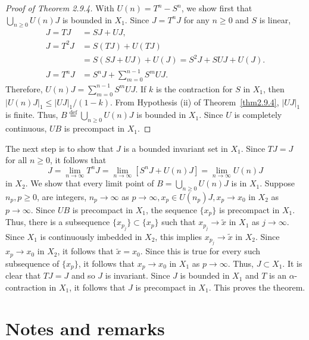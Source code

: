 \documentclass{surv-l}
\makeatletter
\theoremstyle{plain}
\theoremstyle{definition}
\numberwithin{equation}{section}
\numberwithin{figure}{chapter}
\newcommand\addtocline[2]{\let\@secnumber\@empty\@tocwrite{#1}{#2}}
\makeatother
\begin{document}
\begin{proof}[Proof of Theorem 2.9.4]\label{pot2.9.4} With $U(n)=T^{n}-S^{n}$, we show first that $\bigcup_{n\geq 0}U(n)J$ is bounded in $X_{1}$. Since $J=T^{n}J$ for any $n\geq 0$ and $S$ is linear,
\begin{align*}
J=TJ&=SJ+UJ,\\
J=T^{2}J&=S(TJ)+U(TJ)\\
&=S(SJ+UJ)+U(J)=S^{2}J+SUJ+U(J).\\
J=T^{n}J&=S^{n}J+\sum_{m=0}^{n-1}S^{m}UJ.
\end{align*}
Therefore, $U(n)J=\sum_{m=0}^{n-1}S^{m}UJ$. If $k$ is the contraction for $S$ in $X_{1}$, then $|U(n)J|_{1}\leq|UJ|_{1}/(1-k)$. From Hypothesis (ii) of Theorem~\ref{thm2.9.4}, $|UJ|_{1}$ is finite. Thus, $B {\overset{\mathrm{def}}{=}} \bigcup_{n\geq 0}U(n)J$ is bounded in $X_{1}$. Since $U$ is completely continuous, $UB$ is precompact in $X_{1}$.
\end{proof}

The next step is to show that $J$ is a bounded invariant set in $X_{1}$. Since $TJ=J$ for all $n\geq 0$, it follows that
\begin{equation*}
J=\lim_{n\rightarrow\infty}T^{n}J=\lim_{n\rightarrow\infty}[S^{n}J+U(n)J]=\lim_{n\rightarrow\infty}U(n)J
\end{equation*}
in $X_{2}$. We show that every limit point of $B=\bigcup_{n\geq 0}U(n)J$ is in $X_{1}$. Suppose $n_{p}, p\geq 0$, are integers, $n_{p}\rightarrow\infty$ as $ p\rightarrow\infty, x_{p}\in U(n_{p})J, x_{p}\rightarrow x_{0}$ in $X_{2}$ as $ p\rightarrow\infty$. Since $UB$ is precompact in $X_{1}$, the sequence $\{x_{p}\}$ is precompact in $X_{1}$. Thus, there is a subsequence $\{x_{p_{j}}\}\subset\{x_{p}\}$ such that $x_{p_{j}}\rightarrow\tilde{x}$ in $X_{1}$ as $ j\rightarrow\infty$. Since $X_{1}$ is continuously imbedded in $X_{2}$, this implies $x_{p_{j}}\rightarrow\tilde{x}$ in $X_{2}$. Since $x_{p}\rightarrow x_{0}$ in $X_{2}$, it follows that $\tilde{x}=x_{0}$. Since this is true for every such subsequence of $\{x_{p}\}$, it follows that $x_{p}\rightarrow x_{0}$ in $X_{1}$ as $ p\rightarrow\infty$. Thus, $J\subset X_{1}$. It is clear that $TJ=J$ and so $J$ is invariant. Since $J$ is bounded in $X_{1}$ and $T$ is an $\alpha$-contraction in $X_{1}$, it follows that $J$ is precompact in $X_{1}$. This proves the theorem.

\skiptoctrue
\section*{Notes and remarks}
\addtocline{section}{Notes and Remarks}
\end{document}

